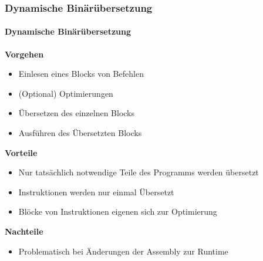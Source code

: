 \begin{frame}
    \frametitle{Dynamische Binärübersetzung}
    \framesubtitle{Dynamische Binärübersetzung}

    \textbf{Vorgehen}
    \begin{itemize}
        \item Einlesen eines Blocks von Befehlen
        \item (Optional) Optimierungen
        \item Übersetzen des einzelnen Blocks
        \item Ausführen des Übersetzten Blocks
    \end{itemize}

    \vspace{0.50cm}

    \textbf{Vorteile}
    \begin{itemize}
        \item Nur tatsächlich notwendige Teile des Programms werden übersetzt
        \item Instruktionen werden nur einmal Übersetzt
        \item Blöcke von Instruktionen eigenen sich zur Optimierung
    \end{itemize}

    \vspace{0.50cm}

    \textbf{Nachteile}
    \begin{itemize}
        \item Problematisch bei Änderungen der Assembly zur Runtime
    \end{itemize}
\end{frame}